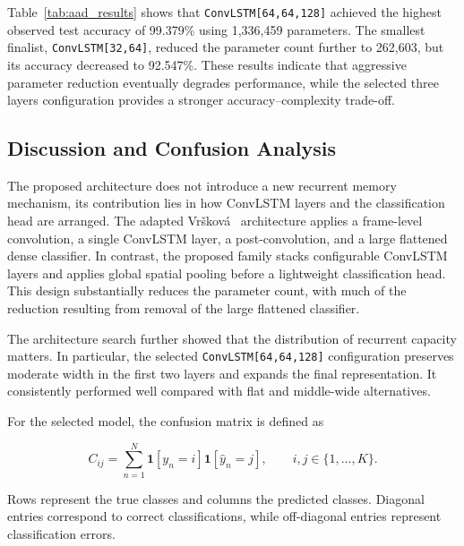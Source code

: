 \documentclass[journal,article,submit,moreauthors]{Definitions/mdpi}
\begin{document}
    Table~\ref{tab:aad_results} shows that \texttt{ConvLSTM[64,64,128]} achieved the
    highest observed test accuracy of 99.379\% using 1,336,459 parameters. The smallest
    finalist, \texttt{ConvLSTM[32,64]}, reduced the parameter count further to 262,603,
    but its accuracy decreased to 92.547\%. These results indicate that aggressive
    parameter reduction eventually degrades performance, while the selected three layers
    configuration provides a stronger accuracy--complexity trade-off.

    \subsection{Discussion and Confusion Analysis}
    \label{sec:aad-discussion}

    The proposed architecture does not introduce a new recurrent memory mechanism, its
    contribution lies in how ConvLSTM layers and the classification head are arranged.
    The adapted Vršková~\cite{vrskova2022} architecture applies a frame-level convolution,
    a single ConvLSTM layer, a post-convolution, and a large flattened dense classifier.
    In contrast, the proposed family stacks configurable ConvLSTM layers and applies
    global spatial pooling before a lightweight classification head. This design
    substantially reduces the parameter count, with much of the reduction resulting from
    removal of the large flattened classifier.

    The architecture search further showed that the distribution of recurrent capacity
    matters. In particular, the selected \texttt{ConvLSTM[64,64,128]} configuration
    preserves moderate width in the first two layers and expands the final representation.
    It consistently performed well compared with flat and middle-wide alternatives.

    For the selected model, the confusion matrix is defined as

    \begin{equation}
        C_{ij}=\sum_{n=1}^{N}
        \mathbf{1}\!\left[y_n=i\right]
        \mathbf{1}\!\left[\hat{y}_n=j\right],
        \qquad i,j\in\{1,\ldots,K\}.
        \label{eq:confusion-matrix}
    \end{equation}

    Rows represent the true classes and columns the predicted classes. Diagonal entries
    correspond to correct classifications, while off-diagonal entries represent
    classification errors.
\end{document}
